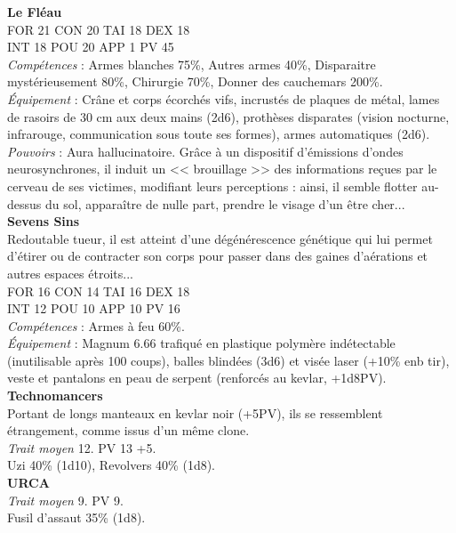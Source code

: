 \documentclass[11pt,twoside,a4paper]{book}
\begin{document}
\textbf{Le Fl{\'e}au}~\\
FOR 21 CON 20 TAI 18 DEX 18~\\
INT 18 POU 20 APP 1 PV 45~\\
\emph{Comp{\'e}tences} : Armes blanches 75\%, Autres armes 40\%, Disparaitre myst{\'e}rieusement 80\%, Chirurgie 70\%, Donner des cauchemars 200\%.~\\
\emph{{\'E}quipement} : Cr{\^a}ne et corps {\'e}corch{\'e}s vifs, incrust{\'e}s de plaques de m{\'e}tal, lames de rasoirs de 30 cm aux deux mains (2d6), proth{\`e}ses disparates (vision nocturne, infrarouge, communication sous toute ses formes), armes automatiques (2d6).~\\
\emph{Pouvoirs} : Aura hallucinatoire. Gr{\^a}ce {\`a} un dispositif d'{\'e}missions d'ondes neurosynchrones, il induit un << brouillage >> des informations re\c{c}ues par le cerveau de ses victimes, modifiant leurs perceptions : ainsi, il semble flotter au-dessus du sol, appara{\^i}tre de nulle part, prendre le visage d'un {\^e}tre cher...~\\

\textbf{Sevens Sins}~\\
Redoutable tueur, il est atteint d'une d{\'e}g{\'e}n{\'e}rescence g{\'e}n{\'e}tique qui lui permet d'{\'e}tirer ou de contracter son corps pour passer dans des gaines d'a{\'e}rations et autres espaces {\'e}troits...~\\
FOR 16 CON 14 TAI 16 DEX 18~\\
INT 12 POU 10 APP 10 PV 16~\\
\emph{Comp{\'e}tences} : Armes {\`a} feu 60\%.~\\
\emph{{\'E}quipement} : Magnum 6.66 trafiqu{\'e} en plastique polym{\`e}re ind{\'e}tectable (inutilisable apr{\`e}s 100 coups), balles blind{\'e}es (3d6) et vis{\'e}e laser (+10\% enb tir), veste et pantalons en peau de serpent (renforc{\'e}s au kevlar, +1d8PV).~\\

\textbf{Technomancers}~\\
Portant de longs manteaux en kevlar noir (+5PV), ils se ressemblent {\'e}trangement, comme issus d'un m{\^e}me clone.~\\
\emph{Trait moyen} 12. PV 13 +5.~\\
Uzi 40\% (1d10), Revolvers 40\% (1d8).~\\

\textbf{URCA}~\\
\emph{Trait moyen} 9. PV 9.~\\
Fusil d'assaut 35\% (1d8).~\\
\end{document}
